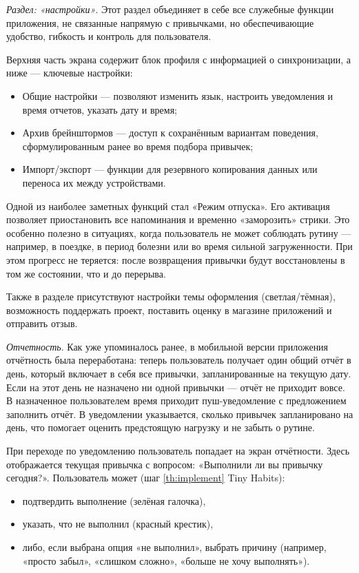 \documentclass[pdflatex,sn-mathphys-num]{sn-jnl}%
\theoremstyle{thmstyleone}%
\theoremstyle{thmstyletwo}%
\theoremstyle{thmstylethree}%
\begin{document}
\textit{Раздел: «настройки»}. Этот раздел объединяет в себе все служебные функции приложения, не связанные напрямую с привычками, но обеспечивающие удобство, гибкость и контроль для пользователя.

Верхняя часть экрана содержит блок профиля с информацией о синхронизации, а ниже — ключевые настройки:

\begin{itemize}
    \item Общие настройки — позволяют изменить язык, настроить уведомления и время отчетов, указать дату и время;
    \item Архив брейнштормов — доступ к сохранённым вариантам поведения, сформулированным ранее во время подбора привычек;
    \item Импорт/экспорт — функции для резервного копирования данных или переноса их между устройствами.
\end{itemize}

Одной из наиболее заметных функций стал «Режим отпуска». Его активация позволяет приостановить все напоминания и временно «заморозить» стрики. Это особенно полезно в ситуациях, когда пользователь не может соблюдать рутину — например, в поездке, в период болезни или во время сильной загруженности. При этом прогресс не теряется: после возвращения привычки будут восстановлены в том же состоянии, что и до перерыва.

Также в разделе присутствуют настройки темы оформления (светлая/тёмная), возможность поддержать проект, поставить оценку в магазине приложений и отправить отзыв.

\textit{Отчетность}. Как уже упоминалось ранее, в мобильной версии приложения отчётность была переработана: теперь пользователь получает один общий отчёт в день, который включает в себя все привычки, запланированные на текущую дату. Если на этот день не назначено ни одной привычки — отчёт не приходит вовсе. В назначенное пользователем время приходит пуш-уведомление с предложением заполнить отчёт. В уведомлении указывается, сколько привычек запланировано на день, что помогает оценить предстоящую нагрузку и не забыть о рутине.

При переходе по уведомлению пользователь попадает на экран отчётности. Здесь отображается текущая привычка с вопросом: «Выполнили ли вы привычку сегодня?». Пользователь может (шаг \ref{th:implement} Tiny Habits):

\begin{itemize}
    \item подтвердить выполнение (зелёная галочка),
    \item указать, что не выполнил (красный крестик),
    \item либо, если выбрана опция «не выполнил», выбрать причину (например, «просто забыл», «слишком сложно», «больше не хочу выполнять»).
\end{itemize}
\end{document}
